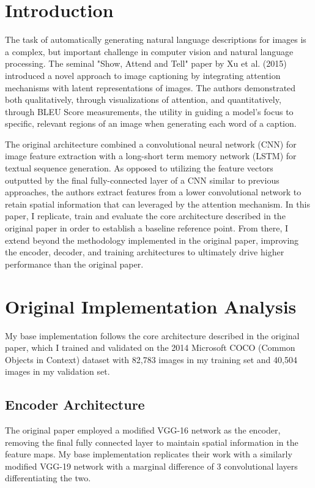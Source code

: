 \documentclass{article}
\theoremstyle{plain}
\theoremstyle{definition}
\theoremstyle{remark}
\begin{document}
\section{Introduction}

The task of automatically generating natural language descriptions for images is a complex, but important challenge in computer vision and natural language processing. The seminal "Show, Attend and Tell" paper by Xu et al. (2015) introduced a novel approach to image captioning by integrating attention mechanisms with latent representations of images. The authors demonstrated both qualitatively, through visualizations of attention, and quantitatively, through BLEU Score measurements, the utility in guiding a model's focus to specific, relevant regions of an image when generating each word of a caption.

The original architecture combined a convolutional neural network (CNN) for image feature extraction with a long-short term memory network (LSTM) for textual sequence generation. As opposed to utilizing the feature vectors outputted by the final fully-connected layer of a CNN similar to previous approaches, the authors extract features from a lower convolutional network to retain spatial information that can leveraged by the attention mechanism. In this paper, I replicate, train and evaluate the core architecture described in the original paper in order to establish a baseline reference point. From there, I extend beyond the methodology implemented in the original paper, improving the encoder, decoder, and training architectures to ultimately drive higher performance than the original paper. 

\section{Original Implementation Analysis}

My base implementation follows the core architecture described in the original paper, which I trained and validated on the 2014 Microsoft COCO (Common Objects in Context) dataset with 82,783 images in my training set and 40,504 images in my validation set. 

\subsection{Encoder Architecture}

The original paper employed a modified VGG-16 network as the encoder, removing the final fully connected layer to maintain spatial information in the feature maps. My base implementation replicates their work with a similarly modified VGG-19 network with a marginal difference of 3 convolutional layers differentiating the two.
\end{document}
